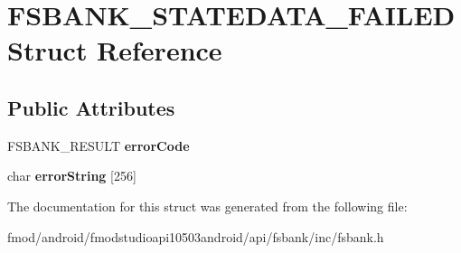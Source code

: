 \hypertarget{struct_f_s_b_a_n_k___s_t_a_t_e_d_a_t_a___f_a_i_l_e_d}{\section{F\+S\+B\+A\+N\+K\+\_\+\+S\+T\+A\+T\+E\+D\+A\+T\+A\+\_\+\+F\+A\+I\+L\+E\+D Struct Reference}
\label{struct_f_s_b_a_n_k___s_t_a_t_e_d_a_t_a___f_a_i_l_e_d}
}
\subsection*{Public Attributes}
\begin{DoxyCompactItemize}
\item 
\hypertarget{struct_f_s_b_a_n_k___s_t_a_t_e_d_a_t_a___f_a_i_l_e_d_a40b0fc50e5278bd7dd80a647897ee054}{F\+S\+B\+A\+N\+K\+\_\+\+R\+E\+S\+U\+L\+T {\bfseries error\+Code}}\label{struct_f_s_b_a_n_k___s_t_a_t_e_d_a_t_a___f_a_i_l_e_d_a40b0fc50e5278bd7dd80a647897ee054}

\item 
\hypertarget{struct_f_s_b_a_n_k___s_t_a_t_e_d_a_t_a___f_a_i_l_e_d_ad411e2b0c08e1fca336dbed6d106dd1e}{char {\bfseries error\+String} \mbox{[}256\mbox{]}}\label{struct_f_s_b_a_n_k___s_t_a_t_e_d_a_t_a___f_a_i_l_e_d_ad411e2b0c08e1fca336dbed6d106dd1e}

\end{DoxyCompactItemize}


The documentation for this struct was generated from the following file\+:\begin{DoxyCompactItemize}
\item 
fmod/android/fmodstudioapi10503android/api/fsbank/inc/fsbank.\+h\end{DoxyCompactItemize}
